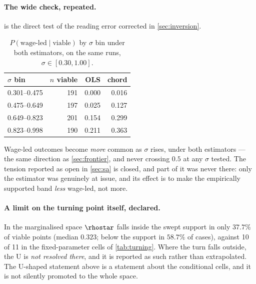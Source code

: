 \paragraph{The wide check, repeated.}  is the direct
test of the reading error corrected in \cref{sec:inversion}.

\begin{table}[htbp]
\centering
\small
\caption{$P(\text{wage-led} \mid \text{viable})$ by $\sigma$ bin under both
estimators, on the same runs, $\sigma \in [0.30, 1.00]$.}
\label{tab:widerepaired}
\begin{tabular}{lrrr}
\toprule
$\sigma$ bin & $n$ viable & OLS & chord\\
\midrule
0.301--0.475 & 191 & 0.000 & 0.016\\
0.475--0.649 & 197 & 0.025 & 0.127\\
0.649--0.823 & 201 & 0.154 & 0.299\\
0.823--0.998 & 190 & 0.211 & 0.363\\
\bottomrule
\end{tabular}
\end{table}

Wage-led outcomes become \emph{more} common as $\sigma$ rises, under both
estimators --- the same direction as \cref{sec:frontier}, and never crossing
$0.5$ at any $\sigma$ tested. The tension reported as open in \cref{sec:sa} is
closed, and part of it was never there: only the estimator was genuinely at
issue, and its effect is to make the empirically supported band \emph{less}
wage-led, not more.

\paragraph{A limit on the turning point itself, declared.} In the marginalised
space $\rhostar$ falls inside the swept support in only $37.7\%$ of viable
points (median $0.323$; below the support in $58.7\%$ of cases), against 10 of
11 in the fixed-parameter cells of \cref{tab:turning}. Where the turn falls
outside, the U is \emph{not resolved there}, and it is reported as such rather
than extrapolated. The U-shaped statement above is a statement about the
conditional cells, and it is not silently promoted to the whole space.
